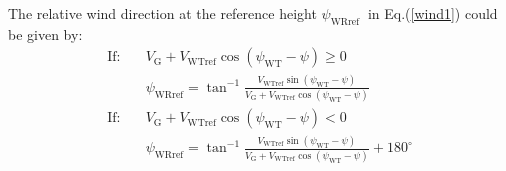 The relative wind direction at the reference height $\psi_{\text {WRref }}$ in Eq.(\ref{wind1}) could be given by:
\begin{equation*}
    \begin{aligned}
        \text{If:} \quad &V_{\mathrm{G}}+V_{\mathrm{WTref}} \cos \left(\psi_{\mathrm{WT}}-\psi\right) \geq 0\\
        &\psi_{\mathrm{WRref}}=\tan ^{-1} \frac{V_{\mathrm{WTref}} \sin \left(\psi_{\mathrm{WT}}-\psi\right)}  {V_{\mathrm{G}}+V_{\mathrm{WTref}} \cos \left(\psi_{\mathrm{WT}}-\psi\right)} \\
        \text{If:} \quad &V_{\mathrm{G}}+V_{\mathrm{WTref}} \cos \left(\psi_{\mathrm{WT}}-\psi\right)<0\\
        &\psi_{\mathrm{WRref}}=\tan ^{-1} \frac{V_{\mathrm{WTref}} \sin \left(\psi_{\mathrm{WT}}-\psi\right)}{V_{\mathrm{G}}+V_{\mathrm{WTref}} \cos \left(\psi_{\mathrm{WT}}-\psi\right)}+180^{\circ}
    \end{aligned}
\end{equation*}

